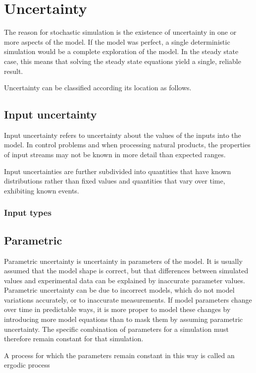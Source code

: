 \section{Uncertainty}
The reason for stochastic simulation is the existence of uncertainty in one or more aspects of the model.  
If the model was perfect, a single deterministic simulation would be a complete exploration of the model.  
In the steady state case, this means that solving the steady state equations yield a single, reliable result.  

Uncertainty can be classified according its location as follows.

\subsection{Input uncertainty}
Input uncertainty refers to uncertainty about the values of the inputs into the model.  
In control problems and when processing natural products, the properties of input streams may not be known in more detail than expected ranges.

Input uncertainties are further subdivided into quantities that have known distributions rather than fixed values and quantities that vary over time, exhibiting known events.

\subsubsection{Input types}

\subsection{Parametric}
Parametric uncertainty is uncertainty in parameters of the model.  
It is usually assumed that the model shape is correct, but that differences between simulated values and experimental data can be explained by inaccurate parameter values.  
Parametric uncertainty can be due to incorrect models, which do not model variations accurately, or to inaccurate measurements.  
If model parameters change over time in predictable ways, it is more proper to model these changes by introducing more model equations than to mask them by assuming parametric uncertainty.  
The specific combination of parameters for a simulation must therefore remain constant for that simulation.

A process for which the parameters remain constant in this way is called an ergodic process

